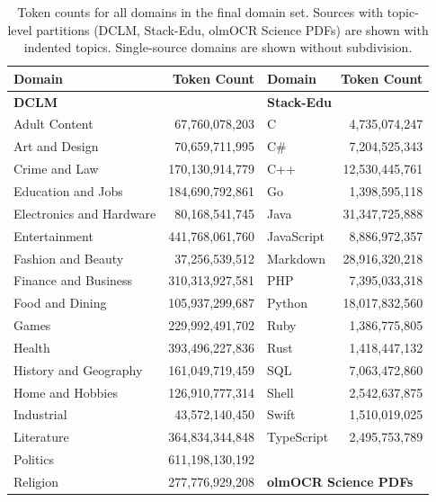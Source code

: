 \documentclass[table]{ai2style/ai2}
\begin{document}
\begin{table}[h]
\centering
\caption{Token counts for all domains in the final domain set. Sources with topic-level partitions (DCLM, Stack-Edu, olmOCR Science PDFs) are shown with indented topics. Single-source domains are shown without subdivision.}
\small
\begin{tabular}{l r | l r}
\toprule
\textbf{Domain} & \textbf{Token Count} & \textbf{Domain} & \textbf{Token Count} \\
\midrule
\multicolumn{2}{l|}{\textbf{DCLM}~\citep{dclm}} & \multicolumn{2}{l}{\textbf{Stack-Edu}~\citep{allal2025smollm2smolgoesbig}} \\
\quad Adult Content & 67,760,078,203 & \quad C & 4,735,074,247 \\
\quad Art and Design & 70,659,711,995 & \quad C\# & 7,204,525,343 \\
\quad Crime and Law & 170,130,914,779 & \quad C++ & 12,530,445,761 \\
\quad Education and Jobs & 184,690,792,861 & \quad Go & 1,398,595,118 \\
\quad Electronics and Hardware & 80,168,541,745 & \quad Java & 31,347,725,888 \\
\quad Entertainment & 441,768,061,760 & \quad JavaScript & 8,886,972,357 \\
\quad Fashion and Beauty & 37,256,539,512 & \quad Markdown & 28,916,320,218 \\
\quad Finance and Business & 310,313,927,581 & \quad PHP & 7,395,033,318 \\
\quad Food and Dining & 105,937,299,687 & \quad Python & 18,017,832,560 \\
\quad Games & 229,992,491,702 & \quad Ruby & 1,386,775,805 \\
\quad Health & 393,496,227,836 & \quad Rust & 1,418,447,132 \\
\quad History and Geography & 161,049,719,459 & \quad SQL & 7,063,472,860 \\
\quad Home and Hobbies & 126,910,777,314 & \quad Shell & 2,542,637,875 \\
\quad Industrial & 43,572,140,450 & \quad Swift & 1,510,019,025 \\
\quad Literature & 364,834,344,848 & \quad TypeScript & 2,495,753,789 \\
\quad Politics & 611,198,130,192 & \multicolumn{2}{l}{} \\
\quad Religion & 277,776,929,208 & \multicolumn{2}{l}{\textbf{olmOCR Science PDFs}~\citep{olmo2025olmo3}} \\

\end{tabular}
\end{table}
\end{document}
